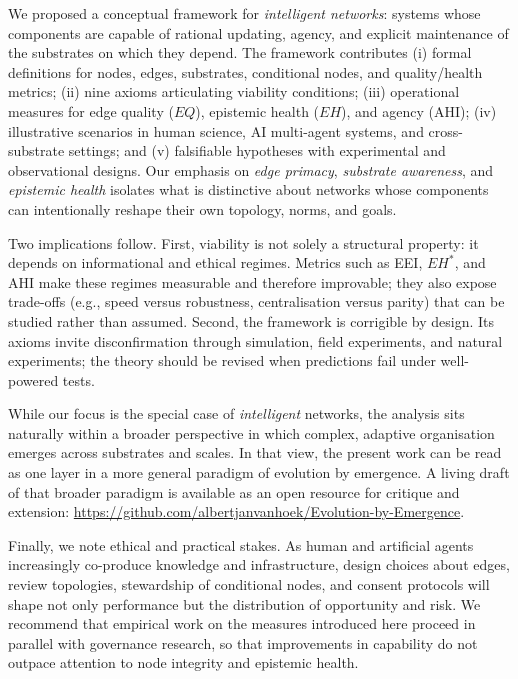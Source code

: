 \documentclass[12pt]{article}
\begin{document}
We proposed a conceptual framework for \emph{intelligent networks}: systems whose components are capable of rational updating, agency, and explicit maintenance of the substrates on which they depend. The framework contributes (i) formal definitions for nodes, edges, substrates, conditional nodes, and quality/health metrics; (ii) nine axioms articulating viability conditions; (iii) operational measures for edge quality ($EQ$), epistemic health ($EH$), and agency (AHI); (iv) illustrative scenarios in human science, AI multi-agent systems, and cross-substrate settings; and (v) falsifiable hypotheses with experimental and observational designs. Our emphasis on \emph{edge primacy}, \emph{substrate awareness}, and \emph{epistemic health} isolates what is distinctive about networks whose components can intentionally reshape their own topology, norms, and goals.

Two implications follow. First, viability is not solely a structural property: it depends on informational and ethical regimes. Metrics such as EEI, $EH^{\ast}$, and AHI make these regimes measurable and therefore improvable; they also expose trade-offs (e.g., speed versus robustness, centralisation versus parity) that can be studied rather than assumed. Second, the framework is corrigible by design. Its axioms invite disconfirmation through simulation, field experiments, and natural experiments; the theory should be revised when predictions fail under well-powered tests.

While our focus is the special case of \emph{intelligent} networks, the analysis sits naturally within a broader perspective in which complex, adaptive organisation emerges across substrates and scales. In that view, the present work can be read as one layer in a more general paradigm of evolution by emergence. A living draft of that broader paradigm is available as an open resource for critique and extension: \url{https://github.com/albertjanvanhoek/Evolution-by-Emergence}.

Finally, we note ethical and practical stakes. As human and artificial agents increasingly co-produce knowledge and infrastructure, design choices about edges, review topologies, stewardship of conditional nodes, and consent protocols will shape not only performance but the distribution of opportunity and risk. We recommend that empirical work on the measures introduced here proceed in parallel with governance research, so that improvements in capability do not outpace attention to node integrity and epistemic health.



\end{document}
